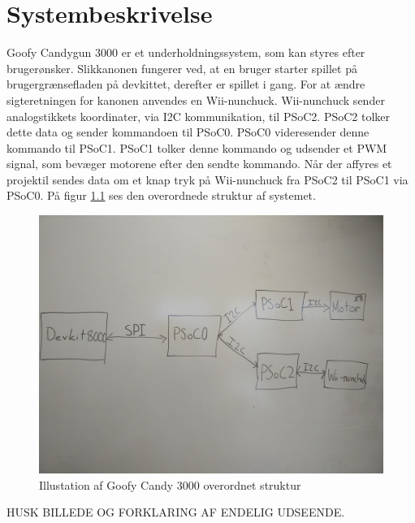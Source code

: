 \chapter{Systembeskrivelse}

Goofy Candygun 3000 er et underholdningssystem, som kan styres efter brugerønsker. Slikkanonen fungerer ved, at en bruger starter spillet på brugergrænsefladen på devkittet, derefter er spillet i gang. For at ændre sigteretningen for kanonen anvendes en Wii-nunchuck. Wii-nunchuck sender analogstikkets koordinater, via I2C kommunikation, til PSoC2. PSoC2 tolker dette data og sender kommandoen til PSoC0. PSoC0 videresender denne kommando til PSoC1. PSoC1 tolker denne kommando og udsender et PWM signal, som bevæger motorene efter den sendte kommando. Når der affyres et projektil sendes data om et knap tryk på Wii-nunchuck fra PSoC2 til PSoC1 via PSoC0. På figur \ref{ref:overordnetstruktur} ses den overordnede struktur af systemet. 

\begin{figure}[h]
	\centering
	\includegraphics[width=\textwidth]{Systembeskrivelse/images/overordnetstruktur}
	\caption{Illustation af Goofy Candy 3000 overordnet struktur}
	\label{ref:overordnetstruktur}
\end{figure}



HUSK BILLEDE OG FORKLARING AF ENDELIG UDSEENDE.